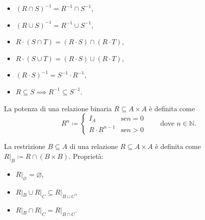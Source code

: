 \documentclass[10pt]{article}
\newcommand{\inv}[1]{{#1}^{-1}}
\newcommand{\N}{\mathbb{N}}
\renewcommand{\emptyset}{\varnothing}
\begin{document}
        \medskip

        \begin{minipage}[h]{.5\textwidth}
            \begin{itemize}
                \item \(\inv{(R \cap S)} = \inv{R} \cap \inv{S}\),
                \item \(\inv{(R \cup S)} = \inv{R} \cup \inv{S}\),
                \item \(R \cdot (S \cap T) = (R \cdot S) \cap (R \cdot T)\),
            \end{itemize}
        \end{minipage}
        \begin{minipage}[h]{.5\textwidth}
            \begin{itemize}
                \item \(R \cdot (S \cup T) = (R \cdot S) \cup (R \cdot T)\),
                \item \(\inv{(R \cdot S)} = \inv{S} \cdot \inv{R}\),
                \item \(R \subseteq S \implies \inv{R} \subseteq \inv{S}\).
            \end{itemize}
        \end{minipage}

        \medskip

        La potenza di una relazione binaria \(R \subseteq A \times A\) è definita come
        \[
            R^{n} \coloneqq
            \begin{cases*}
                I_A & \text{se} n = 0\\
                R \cdot R^{n - 1} & \text{se} n > 0
            \end{cases*}
            \qquad \text{dove } n \in \N.
        \]

        La restrizione \(B \subseteq A\) di una relazione \(R \subseteq A \times A\) è definita come
        \(R|_B \coloneqq R \cap (B \times B)\). Proprietà:
        \begin{multicols}{3}
            \begin{itemize}
                \item \(R|_\emptyset = \emptyset\),
                \item \(R|_B \cup R|_C \subseteq R|_{B \cup C}\),
                \item \(R|_B \cap R|_C = R|_{B \cap C}\).
            \end{itemize}
        \end{multicols}
\end{document}
